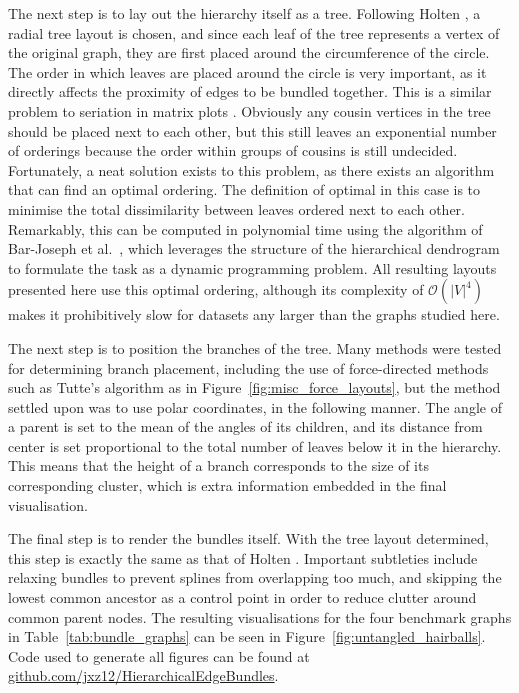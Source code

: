 The next step is to lay out the hierarchy itself as a tree. Following Holten \cite{Holten2006}, a radial tree layout is chosen, and since each leaf of the tree represents a vertex of the original graph, they are first placed around the circumference of the circle. The order in which leaves are placed around the circle is very important, as it directly affects the proximity of edges to be bundled together. This is a similar problem to seriation in matrix plots \cite{Liiv2010}.
Obviously any cousin vertices in the tree should be placed next to each other, but this still leaves an exponential number of orderings because the order within groups of cousins is still undecided.
Fortunately, a neat solution exists to this problem, as there exists an algorithm that can find an optimal ordering. The definition of optimal in this case is to minimise the total dissimilarity between leaves ordered next to each other.
Remarkably, this can be computed in polynomial time using the algorithm of Bar-Joseph et al.\ \cite{Bar-Joseph2001}, which leverages the structure of the hierarchical dendrogram to formulate the task as a dynamic programming problem. All resulting layouts presented here use this optimal ordering, although its complexity of $\mathcal{O}(|V|^4)$ makes it prohibitively slow for datasets any larger than the graphs studied here.

The next step is to position the branches of the tree. Many methods were tested for determining branch placement, including the use of force-directed methods such as Tutte's algorithm as in Figure~\ref{fig:misc_force_layouts}, but the method settled upon was to use polar coordinates, in the following manner.
The angle of a parent is set to the mean of the angles of its children, and its distance from center is set proportional to the total number of leaves below it in the hierarchy. This means that the height of a branch corresponds to the size of its corresponding cluster, which is extra information embedded in the final visualisation.

The final step is to render the bundles itself. With the tree layout determined, this step is exactly the same as that of Holten \cite{Holten2006}. Important subtleties include relaxing bundles to prevent splines from overlapping too much, and skipping the lowest common ancestor as a control point in order to reduce clutter around common parent nodes.
The resulting visualisations for the four benchmark graphs in Table~\ref{tab:bundle_graphs} can be seen in Figure~\ref{fig:untangled_hairballs}.
Code used to generate all figures can be found at \url{github.com/jxz12/HierarchicalEdgeBundles}.

